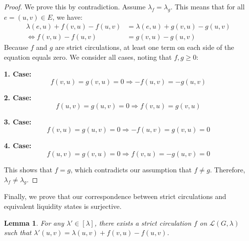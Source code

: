 \documentclass[10pt,twocolumn]{article}
\newtheorem{lemma}[theorem]{Lemma}
\begin{document}
\begin{proof}
  We prove this by contradiction.
  Assume \(\lambda_f = \lambda_g\).
  This means that for all \(e = (u,v) \in E\), we have:
  \begin{equation*}
    \begin{split}
      \lambda(e,u) + f(v,u) - f(u,v) &= \lambda(e,u) + g(v,u) - g(u,v) \\
      \Leftrightarrow f(v,u) - f(u,v) &= g(v,u) - g(u,v)
    \end{split}
  \end{equation*}
  Because \(f\) and \(g\) are strict circulations, at least one term on each side of the equation equals zero. We consider all cases, noting that \(f,g \geq 0\):

  \textbf{1. Case:}
  \[ f(v,u) = g(v,u) = 0 \Rightarrow -f(u,v) = -g(u,v) \]

  \textbf{2. Case:}
  \[ f(u,v) = g(u,v) = 0 \Rightarrow f(v,u) = g(v,u) \]

  \textbf{3. Case:}
  \[ f(v,u) = g(u,v) = 0 \Rightarrow -f(u,v) = g(v,u) = 0 \]

  \textbf{4. Case:}
  \[ f(u,v) = g(v,u) = 0 \Rightarrow f(v,u) = -g(u,v) = 0 \]

  This shows that \(f = g\), which contradicts our assumption that \(f \neq g\). Therefore, \(\lambda_f \neq \lambda_g\).
\end{proof}

Finally, we prove that our correspondence between strict circulations and equivalent liquidity states is surjective.

\begin{lemma}
  For any \(\lambda' \in [\lambda]\), there exists a strict circulation \(f\) on \(\mathcal{L}(G,\lambda)\) such that \(\lambda'(u,v) = \lambda(u,v) + f(v,u) - f(u,v)\).
\end{lemma}
\end{document}
